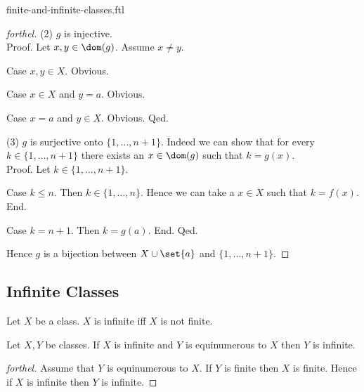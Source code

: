 \documentclass{naproche-library}
\begin{document}
\begin{smodule}{finite-and-infinite-classes.ftl}
\begin{proof}[forthel]
    (2) $g$ is injective. \\
    Proof.
      Let $x, y \in \dom(g)$.
      Assume $x \neq y$.
      
      Case $x, y \in X$. Obvious.

      Case $x \in X$ and $y = a$. Obvious.

      Case $x = a$ and $y \in X$. Obvious.
    Qed.

    (3) $g$ is surjective onto $\{ 1, \dots, n + 1 \}$.
    Indeed we can show that for every $k \in \{1, \dots, n + 1 \}$ there exists an $x \in \dom(g)$ such that $k = g(x)$. \\
    Proof.
      Let $k \in \{ 1, \dots, n + 1 \}$.

      Case $k \leq n$.
        Then $k \in \{ 1, \dots, n \}$.
        Hence we can take a $x \in X$ such that $k = f(x)$.
      End.

      Case $k = n + 1$.
        Then $k = g(a)$.
      End.
    Qed.

    Hence $g$ is a bijection between $X \cup \set{a}$ and $\{ 1, \dots, n + 1 \}$.
  \end{proof}


  \subsection*{Infinite Classes}

  \begin{definition}[forthel,id=FOUNDATIONS_14_6612510618681344,printid]
    Let $X$ be a class.
    $X$ is infinite iff $X$ is not finite.
  \end{definition}

  \begin{proposition}[forthel,id=FOUNDATIONS_14_5814530911240192,printid]
    Let $X, Y$ be classes.
    If $X$ is infinite and $Y$ is equinumerous to $X$ then $Y$ is infinite.
  \end{proposition}
  \begin{proof}[forthel]
    Assume that $Y$ is equinumerous to $X$.
    If $Y$ is finite then $X$ is finite.
    Hence if $X$ is infinite then $Y$ is infinite.
  \end{proof}
\end{smodule}
\end{document}
